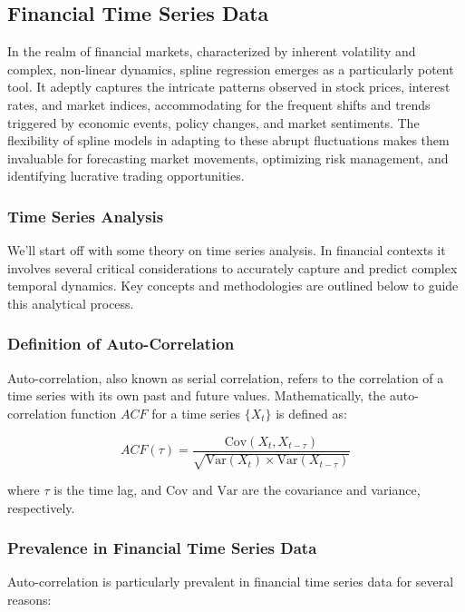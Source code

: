 \documentclass[12pt, twoside,hidelinks]{article}
\theoremstyle{definition}
\numberwithin{equation}{section}
\begin{document}
\subsection{Financial Time Series Data}
In the realm of financial markets, characterized by inherent volatility and complex, non-linear dynamics, spline regression emerges as a particularly potent tool. It adeptly captures the intricate patterns observed in stock prices, interest rates, and market indices, accommodating for the frequent shifts and trends triggered by economic events, policy changes, and market sentiments. The flexibility of spline models in adapting to these abrupt fluctuations makes them invaluable for forecasting market movements, optimizing risk management, and identifying lucrative trading opportunities.

\subsubsection{Time Series Analysis}

We'll start off with some theory on time series analysis. In financial contexts it involves several critical considerations to accurately capture and predict complex temporal dynamics. Key concepts and methodologies are outlined below to guide this analytical process.
\newline

\subsubsection*{Definition of Auto-Correlation}

Auto-correlation, also known as serial correlation, refers to the correlation of a time series with its own past and future values. Mathematically, the auto-correlation function \(ACF\) for a time series \( \{X_t\} \) is defined as:

\[
ACF(\tau) = \frac{\text{Cov}(X_t, X_{t-\tau})}{\sqrt{\text{Var}(X_t) \times \text{Var}(X_{t-\tau})}}
\]

where \( \tau \) is the time lag, and \( \text{Cov} \) and \( \text{Var} \) are the covariance and variance, respectively.

\subsubsection*{Prevalence in Financial Time Series Data}

Auto-correlation is particularly prevalent in financial time series data for several reasons:
\end{document}
